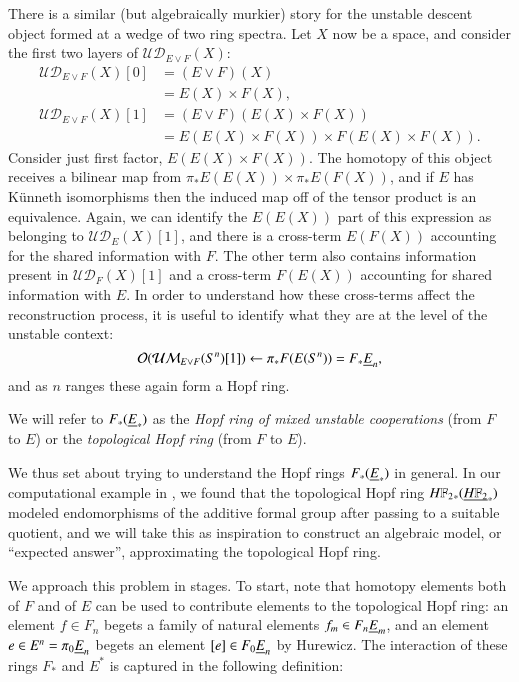 There is a similar (but algebraically murkier) story for the unstable descent object formed at a wedge of two ring spectra.  Let $X$ now be a space, and consider the first two layers of $\mathcal{UD}_{E \vee F}(X)$:
\begin{align*}
\mathcal{UD}_{E \vee F}(X)[0] & = (E \vee F)(X) \\
& = E(X) \times F(X), \\
\mathcal{UD}_{E \vee F}(X)[1] & = (E \vee F)(E(X) \times F(X)) \\
& = E(E(X) \times F(X)) \times F(E(X) \times F(X)).
\end{align*}
Consider just first factor, $E(E(X) \times F(X))$.  The homotopy of this object receives a bilinear map from $\pi_* E(E(X)) \times \pi_* E(F(X))$, and if $E$ has K\"unneth isomorphisms then the induced map off of the tensor product is an equivalence.  Again, we can identify the $E(E(X))$ part of this expression as belonging to $\mathcal{UD}_E(X)[1]$, and there is a cross-term $E(F(X))$ accounting for the shared information with $F$.  The other term also contains information present in $\mathcal{UD}_F(X)[1]$ and a cross-term $F(E(X))$ accounting for shared information with $E$.  In order to understand how these cross-terms affect the reconstruction process, it is useful to identify what they are at the level of the unstable context: \[\mathcal{O}(\mathcal{UM}_{E \vee F}(S^n)[1]) \leftarrow \pi_* F(E(S^n)) = F_* \underline{\smash{E}}_{n},\] and as $n$ ranges these again form a Hopf ring.

\begin{definition}
We will refer to $F_*(\underline{\smash{E}}_{*})$ as the \textit{Hopf ring of mixed unstable cooperations} (from $F$ to $E$) or the \textit{topological Hopf ring} (from $F$ to $E$).
\end{definition}

We thus set about trying to understand the Hopf rings $F_*(\underline{\smash{E}}_{*})$ in general.  In our computational example in , we found that the topological Hopf ring $\HFtwo_*(\OS{\HFtwo}{*})$ modeled endomorphisms of the additive formal group after passing to a suitable quotient, and we will take this as inspiration to construct an algebraic model, or ``expected answer'', approximating the topological Hopf ring.

We approach this problem in stages.  To start, note that homotopy elements both of $F$ and of $E$ can be used to contribute elements to the topological Hopf ring: an element $f \in F_n$ begets a family of natural elements $f_m \in F_n \underline{\smash{E}}_{m}$, and an element $e \in E^n = \pi_0 \underline{\smash{E}}_{n}$ begets an element $[e] \in F_0 \underline{\smash{E}}_{n}$ by Hurewicz.  The interaction of these rings $F_*$ and $E^*$ is captured in the following definition:

